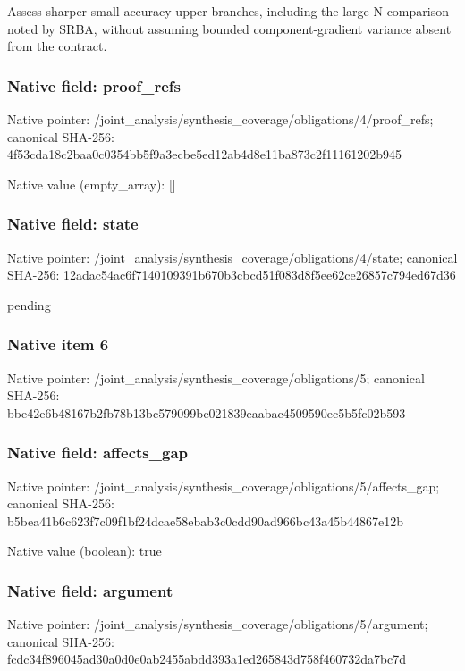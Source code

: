 \documentclass[10pt,a4paper]{article}
\begin{document}
\begingroup\raggedright\sloppy Assess sharper small-accuracy upper branches,\allowbreak{} including the large-N comparison noted by SRBA,\allowbreak{} without assuming bounded component-gradient variance absent from the contract.\par\endgroup

\subsubsection{Native field: proof\_\allowbreak{}refs}
Native pointer: /joint\_\allowbreak{}analysis/synthesis\_\allowbreak{}coverage/obligations/4/proof\_\allowbreak{}refs; canonical SHA-256: 4f53cda18c2baa0c0354bb5f9a3ecbe5ed12ab4d8e11ba873c2f11161202b945

Native value (empty\_\allowbreak{}array): []

\subsubsection{Native field: state}
Native pointer: /joint\_\allowbreak{}analysis/synthesis\_\allowbreak{}coverage/obligations/4/state; canonical SHA-256: 12adac54ac6f7140109391b670b3cbcd51f083d8f5ee62ce26857c794ed67d36

\begingroup\raggedright\sloppy pending\par\endgroup

\subsubsection{Native item 6}
Native pointer: /joint\_\allowbreak{}analysis/synthesis\_\allowbreak{}coverage/obligations/5; canonical SHA-256: bbe42e6b48167b2fb78b13bc579099be021839eaabac4509590ec5b5fc02b593

\subsubsection{Native field: affects\_\allowbreak{}gap}
Native pointer: /joint\_\allowbreak{}analysis/synthesis\_\allowbreak{}coverage/obligations/5/affects\_\allowbreak{}gap; canonical SHA-256: b5bea41b6c623f7c09f1bf24dcae58ebab3c0cdd90ad966bc43a45b44867e12b

Native value (boolean): true

\subsubsection{Native field: argument}
Native pointer: /joint\_\allowbreak{}analysis/synthesis\_\allowbreak{}coverage/obligations/5/argument; canonical SHA-256: fcdc34f896045ad30a0d0e0ab2455abdd393a1ed265843d758f460732da7bc7d
\end{document}
